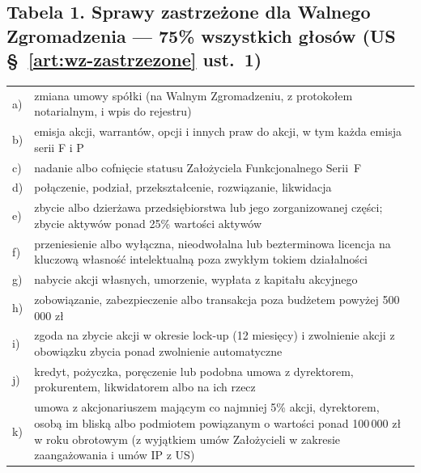 \documentclass[11pt,a4paper]{report}
\begin{document}
\subsection*{Tabela 1. Sprawy zastrzeżone dla Walnego Zgromadzenia --- 75\% wszystkich głosów (US §~\ref{art:wz-zastrzezone} ust.~1)}
\begin{tabularx}{\linewidth}{@{}p{0.6cm} X@{}}
\toprule
a) & zmiana umowy spółki (na Walnym Zgromadzeniu, z protokołem notarialnym, i wpis do rejestru) \\
b) & emisja akcji, warrantów, opcji i innych praw do akcji, w tym każda emisja serii F i P \\
c) & nadanie albo cofnięcie statusu Założyciela Funkcjonalnego Serii~F \\
d) & połączenie, podział, przekształcenie, rozwiązanie, likwidacja \\
e) & zbycie albo dzierżawa przedsiębiorstwa lub jego zorganizowanej części; zbycie aktywów ponad 25\% wartości aktywów \\
f) & przeniesienie albo wyłączna, nieodwołalna lub bezterminowa licencja na kluczową własność intelektualną poza zwykłym tokiem działalności \\
g) & nabycie akcji własnych, umorzenie, wypłata z kapitału akcyjnego \\
h) & zobowiązanie, zabezpieczenie albo transakcja poza budżetem powyżej 500\,000 zł \\
i) & zgoda na zbycie akcji w okresie lock-up (12 miesięcy) i zwolnienie akcji z obowiązku zbycia ponad zwolnienie automatyczne \\
j) & kredyt, pożyczka, poręczenie lub podobna umowa z dyrektorem, prokurentem, likwidatorem albo na ich rzecz \\
k) & umowa z akcjonariuszem mającym co najmniej 5\% akcji, dyrektorem, osobą im bliską albo podmiotem powiązanym o wartości ponad 100\,000 zł w roku obrotowym (z wyjątkiem umów Założycieli w zakresie zaangażowania i umów IP z US) \\
\bottomrule
\end{tabularx}

\end{document}
